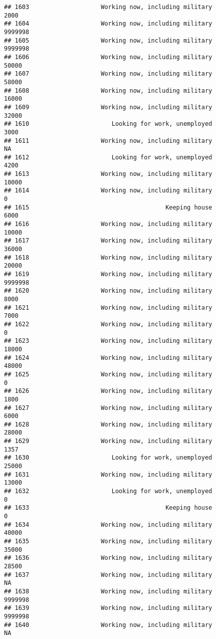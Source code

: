 \documentclass[]{book}
\theoremstyle{definition}
\theoremstyle{definition}
\theoremstyle{remark}
\begin{document}
\begin{verbatim}
## 1603                    Working now, including military            2000
## 1604                    Working now, including military         9999998
## 1605                    Working now, including military         9999998
## 1606                    Working now, including military           50000
## 1607                    Working now, including military           58000
## 1608                    Working now, including military           16000
## 1609                    Working now, including military           32000
## 1610                       Looking for work, unemployed            3000
## 1611                    Working now, including military              NA
## 1612                       Looking for work, unemployed            4200
## 1613                    Working now, including military           10000
## 1614                    Working now, including military               0
## 1615                                      Keeping house            6000
## 1616                    Working now, including military           10000
## 1617                    Working now, including military           36000
## 1618                    Working now, including military           20000
## 1619                    Working now, including military         9999998
## 1620                    Working now, including military            8000
## 1621                    Working now, including military            7000
## 1622                    Working now, including military               0
## 1623                    Working now, including military           18000
## 1624                    Working now, including military           48000
## 1625                    Working now, including military               0
## 1626                    Working now, including military            1800
## 1627                    Working now, including military            6000
## 1628                    Working now, including military           28000
## 1629                    Working now, including military            1357
## 1630                       Looking for work, unemployed           25000
## 1631                    Working now, including military           13000
## 1632                       Looking for work, unemployed               0
## 1633                                      Keeping house               0
## 1634                    Working now, including military           40000
## 1635                    Working now, including military           35000
## 1636                    Working now, including military           28500
## 1637                    Working now, including military              NA
## 1638                    Working now, including military         9999998
## 1639                    Working now, including military         9999998
## 1640                    Working now, including military              NA
\end{verbatim}
\end{document}
